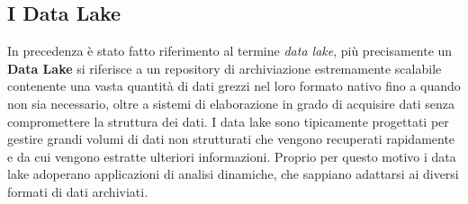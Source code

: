 \subsection{I Data Lake}

In precedenza è stato fatto riferimento al termine \textit{data lake}, più precisamente un \textbf{Data Lake} si riferisce a un repository di archiviazione estremamente scalabile contenente una vasta quantità di dati grezzi nel loro formato nativo fino a quando non sia necessario, oltre a sistemi di elaborazione in grado di acquisire dati senza compromettere la struttura dei dati. I data lake sono tipicamente progettati per gestire grandi volumi di dati non strutturati che vengono recuperati rapidamente e da cui vengono estratte ulteriori informazioni. Proprio per questo motivo i data lake adoperano applicazioni di analisi dinamiche, che sappiano adattarsi ai diversi formati di dati archiviati.\cite{sciencedirect_data_lake}

